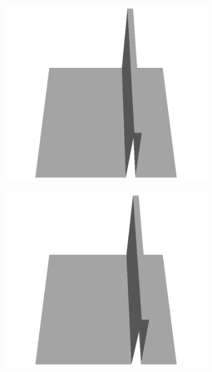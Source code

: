 \documentclass[../document.tex]{subfiles}
\begin{document}
\begin{figure}[H]
\begin{subfigure}[b]{0.160\textwidth}
    \end{subfigure}
    \begin{subfigure}[b]{0.160\textwidth}
    \includegraphics[width=\linewidth]{../img/5/custom_patches/walls_front/all/45-3d.png}
    \end{subfigure}
    \begin{subfigure}[b]{0.160\textwidth}
    \includegraphics[width=\linewidth]{../img/5/custom_patches/walls_front/all/40-3d.png}
    \end{subfigure}

\end{figure}
\end{document}
